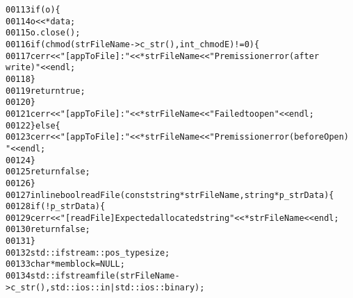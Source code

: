 \begin{footnotesize}
\begin{alltt}
00113             \textcolor{keywordflow}{if}(o)\{
00114                 o << *data;
00115                 o.close();
00116                 \textcolor{keywordflow}{if} (chmod(strFileName->c\_str(),int\_chmodE)!=0)\{
00117                     cerr<<\textcolor{stringliteral}{"[appToFile]: "}<<*strFileName<<\textcolor{stringliteral}{" Premission error(after
       write)"}<<endl;
00118                 \}
00119                 \textcolor{keywordflow}{return} \textcolor{keyword}{true};
00120             \}
00121             cerr<<\textcolor{stringliteral}{"[appToFile]: "}<<*strFileName<<\textcolor{stringliteral}{" Failed to open"}<<endl;
00122         \}\textcolor{keywordflow}{else}\{
00123             cerr<<\textcolor{stringliteral}{"[appToFile]: "}<<*strFileName<<\textcolor{stringliteral}{" Premission error (before Open)
      "}<<endl;
00124         \}
00125         \textcolor{keywordflow}{return} \textcolor{keyword}{false};
00126     \}
00127     \textcolor{keyword}{inline} \textcolor{keywordtype}{bool} readFile(\textcolor{keyword}{const} \textcolor{keywordtype}{string} *strFileName,\textcolor{keywordtype}{string} *p\_strData)\{
00128         \textcolor{keywordflow}{if} (!p\_strData)\{
00129             cerr<<\textcolor{stringliteral}{"[readFile] Expected allocated string"}<<*strFileName<<endl;
00130             \textcolor{keywordflow}{return} \textcolor{keyword}{false};
00131         \}
00132         std::ifstream::pos\_type size;
00133         \textcolor{keywordtype}{char} * memblock = NULL;
00134         std::ifstream file (strFileName->c\_str(), std::ios::in|std::ios::binary);
      

\end{alltt}
\end{footnotesize}
